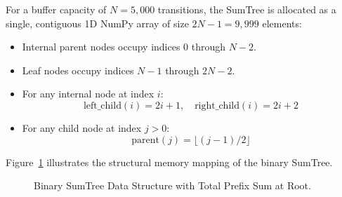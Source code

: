 \documentclass[12pt,a4paper,oneside]{report}
\begin{document}
For a buffer capacity of $N = 5,000$ transitions, the SumTree is allocated as a single, contiguous 1D NumPy array of size $2N - 1 = 9,999$ elements:
\begin{itemize}
    \item Internal parent nodes occupy indices $0$ through $N - 2$.
    \item Leaf nodes occupy indices $N - 1$ through $2N - 2$.
    \item For any internal node at index $i$:
    \begin{equation}
        \text{left\_child}(i) = 2i + 1, \quad \text{right\_child}(i) = 2i + 2
    \end{equation}
    \item For any child node at index $j > 0$:
    \begin{equation}
        \text{parent}(j) = \lfloor (j - 1) / 2 \rfloor
    \end{equation}
\end{itemize}

Figure~\ref{fig:sumtree_diagram} illustrates the structural memory mapping of the binary SumTree.

\begin{figure}[htbp]
\centering
\begin{minipage}{0.85\textwidth}
\centering
{}
\end{minipage}
\caption{Binary SumTree Data Structure with Total Prefix Sum at Root.}
\label{fig:sumtree_diagram}
\end{figure}
\end{document}
